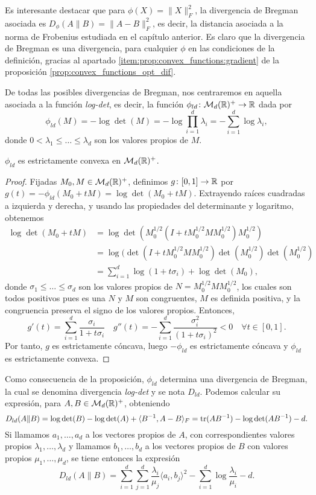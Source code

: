 Es interesante destacar que para $\phi(X) = \|X\|_F^2$, la divergencia de Bregman asociada es $D_{\phi}(A\|B) = \|A-B\|_F^2$, es decir, la distancia asociada a la norma de Frobenius estudiada en el capítulo anterior. Es claro que la divergencia de Bregman es una divergencia, para cualquier $\phi$ en las condiciones de la definición, gracias al apartado \ref{item:prop:convex_functions:gradient} de la proposición \ref{prop:convex_functions_opt_dif}.

De todas las posibles divergencias de Bregman, nos centraremos en aquella asociada a la función \emph{log-det}, es decir, la función $\phi_{ld} \colon \mathcal{M}_d(\mathbb{R})^+ \to \mathbb{R}$ dada por
\[ \phi_{ld}(M) = - \log \det(M) = -\log\prod_{i=1}^d \lambda_i = -\sum_{i=1}^d \log\lambda_i, \]
donde $0 < \lambda_1 \le \dots \le \lambda_d$ son los valores propios de $M$. 

\begin{prop}
    $\phi_{ld}$ es estrictamente convexa en $\mathcal{M}_d(\mathbb{R})^+$.
\end{prop}

\begin{proof}
    Fijadas $M_0, M \in \mathcal{M}_d(\mathbb{R})^+$, definimos $g\colon [0,1] \to \mathbb{R}$ por $g(t) = -\phi_{ld}(M_0 + tM) = \log\det(M_0 + tM)$. Extrayendo raíces cuadradas a izquierda y derecha, y usando las propiedades del determinante y logaritmo, obtenemos
    \begin{align*}
        \log\det(M_0 + tM) &= \log\det(M_0^{1/2}(I + tM_0^{1/2}MM_0^{1/2})M_0^{1/2}) \\
                           &= \log(\det(I+ tM_0^{1/2}MM_0^{1/2})\det(M_0^{1/2})\det(M_0^{1/2}) \\
                           &= \sum_{i=1}^d\log(1+t\sigma_i) + \log\det(M_0),
    \end{align*}
    donde $\sigma_1 \le \dots \le \sigma_d$ son los valores propios de $N = M_0^{1/2}MM_0^{1/2}$, los cuales son todos positivos pues es una $N$ y $M$ son congruentes, $M$ es definida positiva, y la congruencia preserva el signo de los valores propios. Entonces,
    \[g'(t) = \sum_{i=1}^d \frac{\sigma_i}{1+t\sigma_i} \quad g''(t) = - \sum_{i=1}^d \frac{\sigma_i^2}{(1+t\sigma_i)^2} < 0 \quad \forall t \in [0,1].   \]
    Por tanto, $g$ es estrictamente cóncava, luego $-\phi_{ld}$ es estrictamente cóncava y $\phi_{ld}$ es estrictamente convexa.
\end{proof}

Como consecuencia de la proposición, $\phi_{ld}$ determina una divergencia de Bregman, la cual se denomina divergencia \emph{log-det} y se nota $D_{ld}$. Podemos calcular su expresión, para $A, B \in \mathcal{M}_d(\mathbb{R})^+$, obteniendo
\[ D_{ld}(A\|B) = \log\det(B) - \log\det(A) + \langle B^{-1},A-B\rangle_F = \operatorname{tr}(AB^{-1}) -\log\det(AB^{-1}) -d.\]
Si llamamos $a_1,\dots,a_d$ a los vectores propios de $A$, con correspondientes valores propios $\lambda_1, \dots,\lambda_d$ y llamamos $b_1,\dots,b_d$ a los vectores propios de $B$ con valores propios $\mu_1,\dots,\mu_d$, se tiene entonces la expresión
\[ D_{ld}(A\|B) = \sum_{i=1}^d\sum_{j=1}^d \frac{\lambda_i}{\mu_j}\langle a_i,b_j\rangle^2 - \sum_{i=1}^d \log \frac{\lambda_i}{\mu_i} - d.\]

